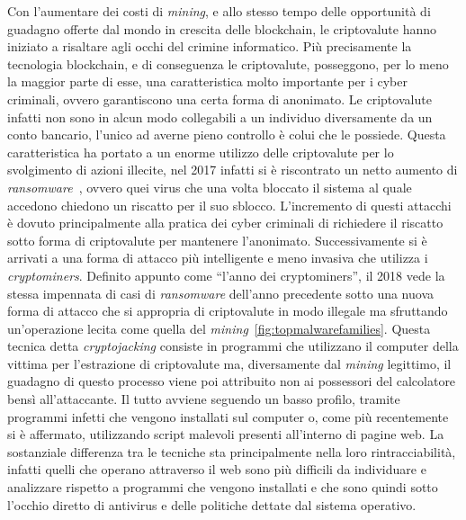 \documentclass[conference]{IEEEtran}
\begin{document}
Con l'aumentare dei costi di \emph{mining}, e allo stesso tempo delle opportunità di guadagno offerte dal mondo in crescita delle blockchain, le criptovalute hanno iniziato a risaltare agli occhi del crimine informatico. Più precisamente la tecnologia blockchain, e di conseguenza le criptovalute, posseggono, per lo meno la maggior parte di esse, una caratteristica molto importante per i cyber criminali, ovvero garantiscono una certa forma di anonimato. Le criptovalute infatti non sono in alcun modo collegabili a un individuo diversamente da un conto bancario, l'unico ad averne pieno controllo è colui che le possiede. Questa caratteristica ha portato a un enorme utilizzo delle criptovalute per lo svolgimento di azioni illecite, nel 2017 infatti si è riscontrato un netto aumento di \emph{ransomware}~\citep{skyboxtrends}, ovvero quei virus che una volta bloccato il sistema al quale accedono chiedono un riscatto per il suo sblocco. L'incremento di questi attacchi è dovuto principalmente alla pratica dei cyber criminali di richiedere il riscatto sotto forma di criptovalute per mantenere l'anonimato. Successivamente si è arrivati a una forma di attacco più intelligente e meno invasiva che utilizza i \emph{cryptominers}. Definito appunto come ``l'anno dei cryptominers'', il 2018 vede la stessa impennata di casi di \emph{ransomware} dell'anno precedente sotto una nuova forma di attacco che si appropria di criptovalute in modo illegale ma sfruttando un'operazione lecita come quella del \emph{mining}~\ref{fig:topmalwarefamilies}. Questa tecnica detta \emph{cryptojacking} consiste in programmi che utilizzano il computer della vittima per l'estrazione di criptovalute ma, diversamente dal \emph{mining} legittimo, il guadagno di questo processo viene poi attribuito non ai possessori del calcolatore bensì all'attaccante. Il tutto avviene seguendo un basso profilo, tramite programmi infetti che vengono installati sul computer o, come più recentemente si è affermato, utilizzando script malevoli presenti all'interno di pagine web. La sostanziale differenza tra le tecniche sta principalmente nella loro rintracciabilità, infatti quelli che operano attraverso il web sono più difficili da individuare e analizzare rispetto a programmi che vengono installati e che sono quindi sotto l'occhio diretto di antivirus e delle politiche dettate dal sistema operativo.\\
\end{document}
